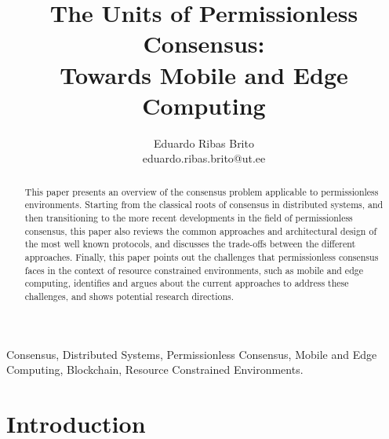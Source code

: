 \documentclass[journal]{IEEEtran}
\begin{document}
\title{The Units of Permissionless Consensus: \\ Towards Mobile and Edge Computing}

\author{Eduardo Ribas Brito \\ eduardo.ribas.brito@ut.ee}

\maketitle

\begin{abstract}

This paper presents an overview of the consensus problem
applicable to permissionless environments. Starting from 
the classical roots of consensus in distributed systems,
and then transitioning to the more recent developments in the
field of permissionless consensus, this paper also reviews
the common approaches and architectural design of the most well known protocols, 
and discusses the trade-offs between the different approaches.
Finally, this paper points out the challenges that
permissionless consensus faces in the context of resource
constrained environments, such as mobile and edge computing,
identifies and argues about the current approaches to address these challenges,
and shows potential research directions.

\end{abstract}

\begin{IEEEkeywords}
Consensus, Distributed Systems, Permissionless Consensus, Mobile and Edge Computing, Blockchain, Resource Constrained Environments.
\end{IEEEkeywords}

\section{Introduction}
\end{document}
